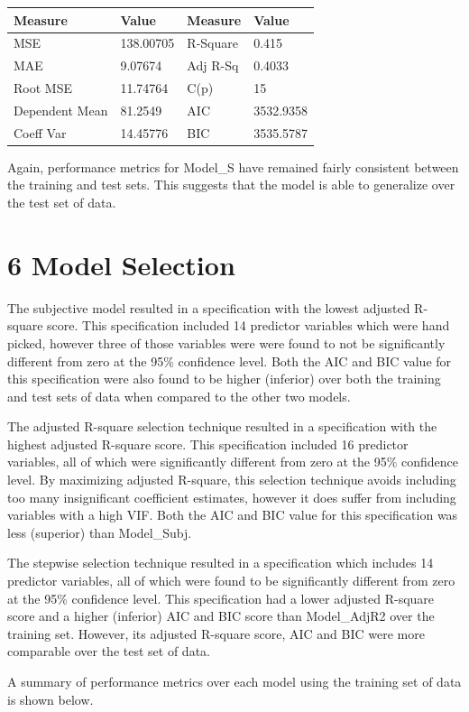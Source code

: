 \documentclass[]{article}
\begin{document}
\begin{longtable}[]{@{}llll@{}}
\toprule
Measure & Value & Measure & Value\tabularnewline
\midrule
\endhead
MSE & 138.00705 & R-Square & 0.415\tabularnewline
MAE & 9.07674 & Adj R-Sq & 0.4033\tabularnewline
Root MSE & 11.74764 & C(p) & 15\tabularnewline
Dependent Mean & 81.2549 & AIC & 3532.9358\tabularnewline
Coeff Var & 14.45776 & BIC & 3535.5787\tabularnewline
\bottomrule
\end{longtable}

Again, performance metrics for Model\_S have remained fairly consistent
between the training and test sets. This suggests that the model is able
to generalize over the test set of data.

\section{6 Model Selection}\label{model-selection}

The subjective model resulted in a specification with the lowest
adjusted R-square score. This specification included 14 predictor
variables which were hand picked, however three of those variables were
were found to not be significantly different from zero at the 95\%
confidence level. Both the AIC and BIC value for this specification were
also found to be higher (inferior) over both the training and test sets
of data when compared to the other two models.

The adjusted R-square selection technique resulted in a specification
with the highest adjusted R-square score. This specification included 16
predictor variables, all of which were significantly different from zero
at the 95\% confidence level. By maximizing adjusted R-square, this
selection technique avoids including too many insignificant coefficient
estimates, however it does suffer from including variables with a high
VIF. Both the AIC and BIC value for this specification was less
(superior) than Model\_Subj.

The stepwise selection technique resulted in a specification which
includes 14 predictor variables, all of which were found to be
significantly different from zero at the 95\% confidence level. This
specification had a lower adjusted R-square score and a higher
(inferior) AIC and BIC score than Model\_AdjR2 over the training set.
However, its adjusted R-square score, AIC and BIC were more comparable
over the test set of data.

A summary of performance metrics over each model using the training set
of data is shown below.
\end{document}
